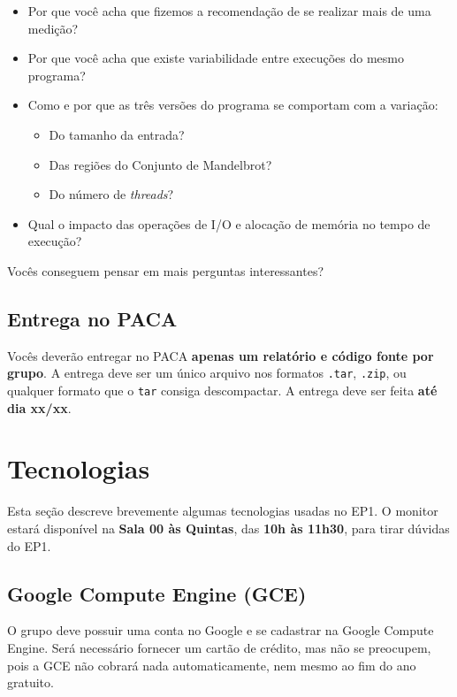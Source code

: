 \documentclass[final,12pt,a4paper]{elsarticle}
\begin{document}
\begin{itemize}
    \item Por que você acha que fizemos a recomendação de se realizar
    mais de uma medição?
    \item Por que você acha que existe variabilidade entre execuções do mesmo
    programa?
    \item Como e por que as três versões do programa se comportam com a variação:
        \begin{itemize}
            \item Do tamanho da entrada?
            \item Das regiões do Conjunto de Mandelbrot?
            \item Do número de \textit{threads}?
        \end{itemize}
    \item Qual o impacto das operações de I/O e alocação de memória no tempo de
    execução?
\end{itemize}

Vocês conseguem pensar em mais perguntas interessantes?

\subsection{Entrega no PACA}

Vocês deverão entregar no PACA \textbf{apenas um relatório e código fonte por
grupo}. A entrega deve ser um único arquivo nos formatos \texttt{.tar},
\texttt{.zip}, ou qualquer formato que o \texttt{tar} consiga descompactar.
A entrega deve ser feita \textbf{até dia xx/xx}.

\section{Tecnologias}

Esta seção descreve brevemente algumas tecnologias usadas no EP1.  O monitor
estará disponível na \textbf{Sala 00 às Quintas}, das \textbf{10h às 11h30},
para tirar dúvidas do EP1.

\subsection{Google Compute Engine (GCE)}

O grupo deve possuir uma conta no Google e se cadastrar na Google Compute
Engine. Será necessário fornecer um cartão de crédito, mas não se preocupem,
pois a GCE não cobrará nada automaticamente, nem mesmo ao fim do ano gratuito.
\end{document}
